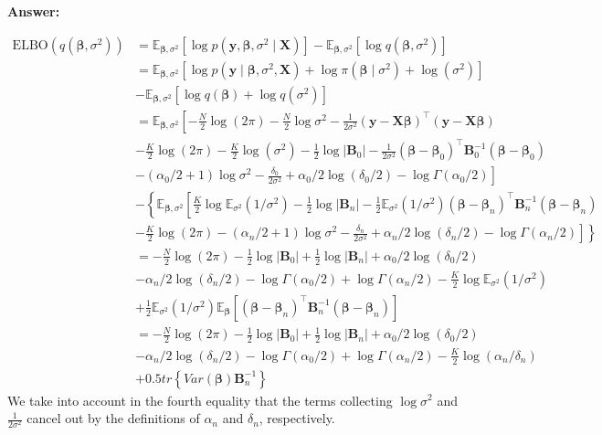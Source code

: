 \begin{enumerate}[leftmargin=*]
\textbf{Answer:}

\begin{align*}
	\text{ELBO}(q(\boldsymbol{\beta},\sigma^2))&=\mathbb{E}_{\boldsymbol{\beta},\sigma^2}[\log p(\boldsymbol{y},\boldsymbol{\beta},\sigma^2\mid\boldsymbol{X})]-\mathbb{E}_{\boldsymbol{\beta},\sigma^2}[\log q(\boldsymbol{\beta},\sigma^2)]\\
	&=\mathbb{E}_{\boldsymbol{\beta},\sigma^2}[\log p(\boldsymbol{y}\mid\boldsymbol{\beta},\sigma^2,\boldsymbol{X})+\log \pi(\boldsymbol{\beta}\mid\sigma^2)+\log(\sigma^2)]\\
	&-\mathbb{E}_{\boldsymbol{\beta},\sigma^2}[\log q(\boldsymbol{\beta}) + \log q(\sigma^2)]\\
	&=\mathbb{E}_{\boldsymbol{\beta},\sigma^2}\left[-\frac{N}{2}\log (2\pi)-\frac{N}{2}\log\sigma^2 - \frac{1}{2\sigma^2}(\boldsymbol{y}-\boldsymbol{X}\boldsymbol{\beta})^{\top}(\boldsymbol{y}-\boldsymbol{X}\boldsymbol{\beta})\right.\\
	&\left.-\frac{K}{2}\log(2\pi)-\frac{K}{2}\log(\sigma^2)-\frac{1}{2}\log|\boldsymbol{B}_0|-\frac{1}{2\sigma^2}(\boldsymbol{\beta}-\boldsymbol{\beta}_0)^{\top}\boldsymbol{B}_0^{-1}(\boldsymbol{\beta}-\boldsymbol{\beta}_0)\right.\\
	&-\left.(\alpha_0/2+1)\log\sigma^2-\frac{\delta_0}{2\sigma^2}+\alpha_0/2\log(\delta_0/2)-\log\Gamma(\alpha_0/2)\right]\\
	&-\left\{\mathbb{E}_{\boldsymbol{\beta},\sigma^2}\left[\frac{K}{2}\log\mathbb{E}_{{\sigma^2}}(1/\sigma^2)-\frac{1}{2}\log|\boldsymbol{B}_n|-\frac{1}{2}\mathbb{E}_{{\sigma^2}}(1/\sigma^2)(\boldsymbol{\beta}-\boldsymbol{\beta}_n)^{\top}\boldsymbol{B}_n^{-1}(\boldsymbol{\beta}-\boldsymbol{\beta}_n)\right.\right.\\
	&\left.\left.-\frac{K}{2}\log(2\pi)-(\alpha_n/2+1)\log\sigma^2-\frac{\delta_n}{2\sigma^2}+\alpha_n/2\log(\delta_n/2)-\log\Gamma(\alpha_n/2)\right]\right\}\\
	&=-\frac{N}{2}\log (2\pi)-\frac{1}{2}\log|\boldsymbol{B}_0|+\frac{1}{2}\log|\boldsymbol{B}_n|+\alpha_0/2\log(\delta_0/2)\\
	&-\alpha_n/2\log(\delta_n/2)-\log\Gamma(\alpha_0/2)+\log\Gamma(\alpha_n/2)-\frac{K}{2}\log\mathbb{E}_{{\sigma^2}}(1/\sigma^2)\\
	&+\frac{1}{2}\mathbb{E}_{{\sigma^2}}(1/\sigma^2)\mathbb{E}_{\boldsymbol{\beta}}\left[(\boldsymbol{\beta}-\boldsymbol{\beta}_n)^{\top}\boldsymbol{B}_n^{-1}(\boldsymbol{\beta}-\boldsymbol{\beta}_n)\right]\\
	&=-\frac{N}{2}\log (2\pi)-\frac{1}{2}\log|\boldsymbol{B}_0|+\frac{1}{2}\log|\boldsymbol{B}_n|+\alpha_0/2\log(\delta_0/2)\\
	&-\alpha_n/2\log(\delta_n/2)-\log\Gamma(\alpha_0/2)+\log\Gamma(\alpha_n/2)-\frac{K}{2}\log(\alpha_n/\delta_n)\\
	&+0.5tr\left\{Var(\boldsymbol{\beta})\boldsymbol{B}_n^{-1}\right\}
\end{align*}
We take into account in the fourth equality that the terms collecting $\log\sigma^2$ and $\frac{1}{2\sigma^2}$ cancel out by the definitions of $\alpha_n$ and $\delta_n$, respectively.  
\end{enumerate}